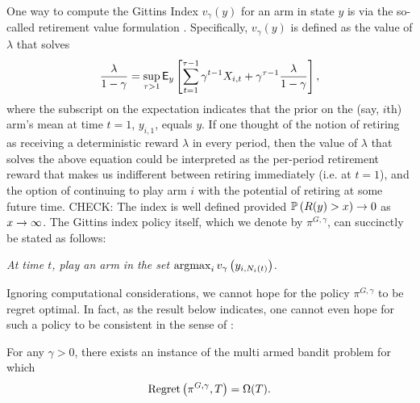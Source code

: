 One way to compute the Gittins Index $v_\gamma(y)$ for an arm in state $y$ is via the so-called retirement value formulation \cite{whittle1980multi}. Specifically, $v_\gamma(y)$ is defined as the value of $\lambda$ that solves
\begin{equation} \label{eqn:gittins_index}
\frac{\lambda}{1-\gamma} = \sup_{\tau > 1}\mathsf{E}_{y}\left[\sum_{t=1}^{\tau-1} \gamma^{t-1} X_{i,t} + \gamma^{\tau-1} \frac{\lambda}{1-\gamma}
\right],
\end{equation}
where the subscript on the expectation indicates that the prior on the (say, $i$th) arm's mean at time $t=1$, $y_{i,1}$, equals $y$. If one thought of the notion of retiring as receiving a deterministic reward $\lambda$ in every period, then the value of $\lambda$ that solves the above equation could be interpreted as the per-period retirement reward that makes us indifferent between retiring immediately (i.e. at $t=1$), and the option of continuing to play arm $i$ with the potential of retiring at some future time. {\color{red} CHECK: The index is well defined provided $\mathbb{P} \left( R(y) > x \right)  \rightarrow 0$ as $x \rightarrow \infty$}. The Gittins index policy itself, which we denote by $\pi^{G,\gamma}$, can succinctly be stated as follows: 
\begin{center}
{\em At time $t$, play an arm in the set 
$\operatorname*{\mathrm{argmax}}_{i} v_\gamma
\left(
y_{i,N_i(t)}
\right)$.
} 
\end{center}
Ignoring computational considerations, we cannot hope for the policy $\pi^{G,\gamma}$ to be regret optimal. In fact, as the result below indicates, one cannot even hope for such a policy to be consistent in the sense of \cite{lairobbins85}:
\begin{lemma}
\label{le:linearregret}
	For any $\gamma > 0$, there exists an instance of the multi armed bandit problem for which 
	\[
	{\rm Regret}\left(
	\pi^{G,\gamma},T
	\right)
	= 
	\Omega(T).
	\]
\end{lemma}
